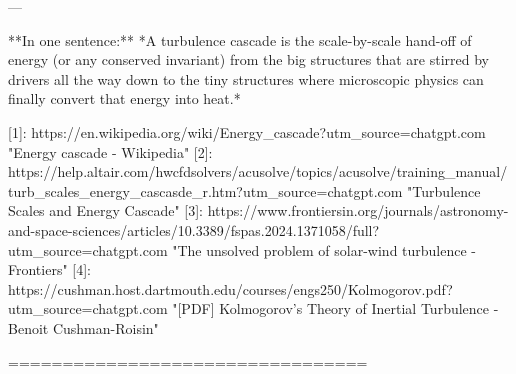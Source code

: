 ---

**In one sentence:**
*A turbulence cascade is the scale-by-scale hand-off of energy (or any conserved invariant) from the big structures that are stirred by drivers all the way down to the tiny structures where microscopic physics can finally convert that energy into heat.*

[1]: https://en.wikipedia.org/wiki/Energy_cascade?utm_source=chatgpt.com "Energy cascade - Wikipedia"
[2]: https://help.altair.com/hwcfdsolvers/acusolve/topics/acusolve/training_manual/turb_scales_energy_cascasde_r.htm?utm_source=chatgpt.com "Turbulence Scales and Energy Cascade"
[3]: https://www.frontiersin.org/journals/astronomy-and-space-sciences/articles/10.3389/fspas.2024.1371058/full?utm_source=chatgpt.com "The unsolved problem of solar-wind turbulence - Frontiers"
[4]: https://cushman.host.dartmouth.edu/courses/engs250/Kolmogorov.pdf?utm_source=chatgpt.com "[PDF] Kolmogorov's Theory of Inertial Turbulence - Benoit Cushman-Roisin"




=================================


